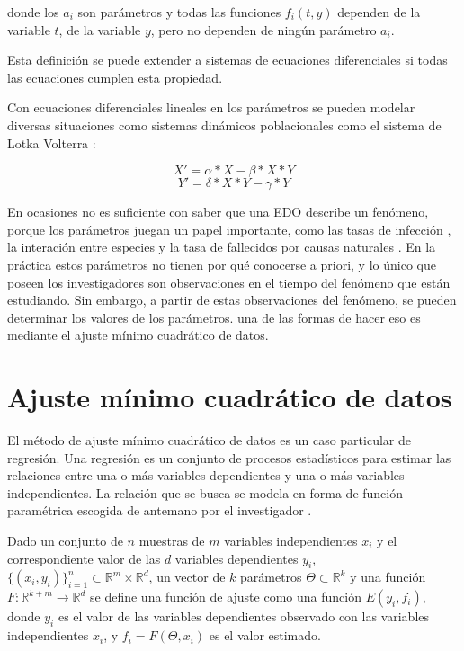 donde los $a_i$ son parámetros y todas las funciones $f_i(t,y)$ dependen de la variable $t$, de la variable $y$, pero no dependen de ningún parámetro $a_i$.

Esta definición se puede extender a sistemas de ecuaciones diferenciales si todas las ecuaciones cumplen esta propiedad.

Con ecuaciones diferenciales lineales en los parámetros se pueden modelar diversas situaciones como sistemas dinámicos poblacionales como el sistema de Lotka Volterra \cite{Hoppensteadt:2006}:

$$X' = \alpha * X - \beta * X * Y$$
$$Y' = \delta * X * Y - \gamma * Y$$

En ocasiones no es suficiente con saber que una EDO describe un fenómeno, porque los parámetros juegan un papel importante, como las tasas de infección \cite{weiss2013sir}, la interación entre especies \cite{gaucel2014learning} y la tasa de fallecidos por causas naturales \cite{kuddus2021mathematical}. En la práctica estos parámetros no tienen por qué conocerse a priori, y lo único que poseen los investigadores son observaciones en el tiempo del fenómeno que están estudiando. Sin embargo, a partir de estas observaciones del fenómeno, se pueden determinar los valores de los parámetros. una de las formas de hacer eso es mediante el ajuste mínimo cuadrático de datos.

\section{Ajuste mínimo cuadrático de datos}\label{section:min_square}

El método de ajuste mínimo cuadrático de datos es un caso particular de regresión. Una regresión es un conjunto de procesos estadísticos para estimar las relaciones entre una o más variables dependientes y una o más variables independientes. La relación que se busca se modela en forma de función paramétrica escogida de antemano por el investigador \cite{johnson2015applied}.

Dado un conjunto de $n$ muestras de $m$ variables independientes $x_i$ y el correspondiente valor de las $d$ variables dependientes $y_i$, $\{(x_i, y_i)\}^n_{i=1} \subset \mathbb{R}^m \times \mathbb{R}^d$, un vector de $k$ parámetros $\Theta \subset \mathbb{R}^k$ y una función $F : \mathbb{R}^{k + m} \rightarrow \mathbb{R}^d$ se define una función de ajuste como una función $E(y_i, f_i)$, donde $y_i$ es el valor de las variables dependientes observado con las variables independientes $x_i$, y $f_i = F(\Theta, x_i)$ es el valor estimado.

